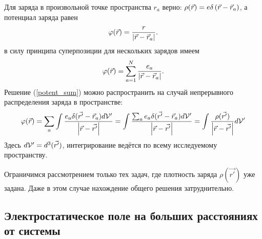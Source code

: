     Для заряда в произвольной точке пространства $r_a$ верно: $\rho(\vec{r}) = e\delta\left({\vec{r} - \vec{r}_a}\right)$, а потенциал заряда равен
    \[
        \varphi(\vec{r}) = \frac{r}{\left|{\vec{r} - \vec{r}_a}\right|}.
    \]
    в силу принципа суперпозиции для нескольких зарядов имеем
    \begin{equation}
        \varphi(\vec{r}) = \sum_{a=1}^N \frac{e_a}{\left|{\vec{r} - \vec{r}_a}\right|}. \label{potent_sum}
    \end{equation}
    Решение (\ref{potent_sum}) можно распространить на случай непрерывного распределения заряда в пространстве:
    \[
        \varphi(\vec{r}) = \sum_a \int \frac{e_a\delta(\vec{r'} - \vec{r}_a)d \mathcal{V} '}{\left|{\vec{r} - \vec{r'}}\right|} = \int \frac{\sum_a e_a\delta(\vec{r'} - \vec{r}_a)d \mathcal{V} '}{\left|{\vec{r} - \vec{r'}}\right|} =
        \int \frac{\rho(\vec{r'})}{\left|{\vec{r} - \vec{r'}}\right|} d\mathcal{V}'
    \]
    Здесь $d\mathcal{V}' = d^3(\vec{r'})$, интегрирование ведётся по всему исследуемому пространству.

    Ограничимся рассмотрением только тех задач, где плотность заряда $\rho(\vec{r'})$ уже задана. Даже в этом случае нахождение общего решения затруднительно.

\subsection{Электростатическое поле на больших расстояниях от системы}
    \begin{figure}[h]
        \centering{
            
        }
    \end{figure}

